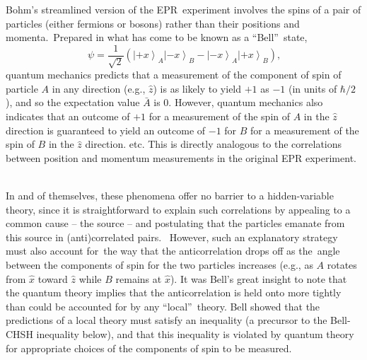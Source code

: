 \documentclass[12pt]{article}%
\begin{document}
Bohm's streamlined version of the EPR\ experiment \cite{Boh51} involves the
spins of a pair of particles (either fermions or bosons) rather than their
positions and momenta.\ Prepared in what has come to be known as a
\textquotedblleft Bell\textquotedblright\ state,
\begin{equation}
\psi=\frac{1}{\sqrt{2}}(\left\vert +x\right\rangle _{A}\left\vert
-x\right\rangle _{B}-\left\vert -x\right\rangle _{A}\left\vert +x\right\rangle
_{B})\text{,}%
\end{equation}
quantum mechanics predicts that a measurement of the component of spin of
particle $A$ in any direction (e.g., $\hat{z}$) is as likely to yield $+1$ as
$-1$ (in units of $\hbar/2$), and so the expectation value $\bar{A}$ is $0$.
However, quantum mechanics also indicates that an outcome of $+1$ for a
measurement of the spin of $A$ in the $\hat{z}$ direction is guaranteed to
yield an outcome of $-1$ for $B$ for a measurement of the spin of $B$ in the
$\hat{z}$ direction. etc. This is directly analogous to the correlations
between position and momentum measurements in the original EPR experiment. \ 

In and of themselves, these phenomena offer no barrier to a hidden-variable
theory, since it is straightforward to explain such correlations by appealing
to a common cause -- the source -- and postulating that the particles emanate
from this source in (anti)correlated pairs. \ However, such an explanatory
strategy must also account for\ the way that the anticorrelation drops off as
the\ angle between the components of spin for the two particles increases
(e.g., as $A$ rotates from $\hat{x}$ toward $\hat{z}$ while $B$ remains at
$\hat{x}$). It was Bell's great insight to note that the quantum theory
implies that the anticorrelation is held onto more tightly than could be
accounted for by any \textquotedblleft local\textquotedblright\ theory. Bell
showed that the predictions of a local theory must satisfy an inequality (a
precursor to the Bell-CHSH inequality below), and that this inequality is
violated by quantum theory for appropriate choices of the components of spin
to be measured.
\end{document}
